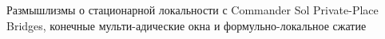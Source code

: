 \documentclass[11pt]{article}
\begin{document}
\SLmaketitle
  {Размышлизмы о стационарной локальности с Commander Sol}
  {Private-Place Bridges, конечные мульти-адические окна и формульно-локальное сжатие}

\tableofcontents
\clearpage


\end{document}
